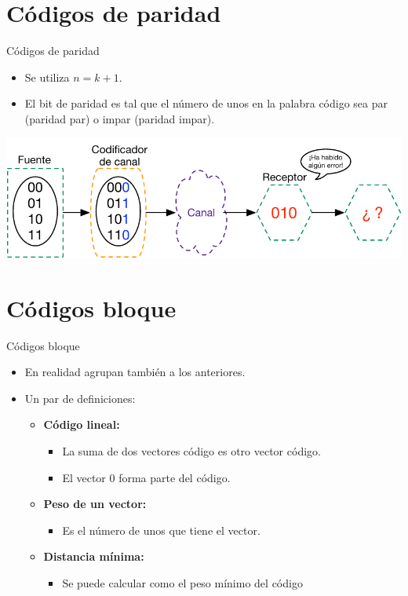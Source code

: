 \documentclass[10pt,compress]{beamer} %
\begin{document}
\section{Códigos de paridad}
\begin{frame}{Códigos de paridad}
  \begin{itemize}
    \item Se utiliza $n = k+1$.
    \item El bit de paridad es tal que el número de unos en la palabra código sea par (paridad par) o impar (paridad impar).
  \end{itemize}
  \centering \includegraphics[width=0.8\linewidth]{../Apuntes/Figuras/CodificacionDeparidad.pdf}
\end{frame}


\section{Códigos bloque}
\begin{frame}{Códigos bloque}
  \begin{itemize}
    \item En realidad agrupan también a los anteriores.
    \item Un par de definiciones:
    \begin{itemize}
      \item {\bf Código lineal:}
      \begin{itemize}
        \item La suma de dos vectores código es otro vector código.
        \item El vector $0$ forma parte del código.
      \end{itemize}
      \item {\bf Peso de un vector:}
      \begin{itemize}
        \item Es el número de unos que tiene el vector.
      \end{itemize}
      \item {\bf Distancia mínima:}
      \begin{itemize}
        \item Se puede calcular como el peso mínimo del código
      \end{itemize}
    \end{itemize}
  \end{itemize}
\end{frame}
\end{document}
